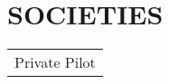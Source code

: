 \documentclass[a4paper]{lyu-resume} %
\begin{document}
\begin{minipage}[t]{0.66\textwidth}

\sectionspace %

\section{SOCIETIES} 

\begin{tabular}{l}
\textbullet{} Private Pilot\\
\end{tabular}

\sectionspace %
\end{minipage} %
\end{document}
